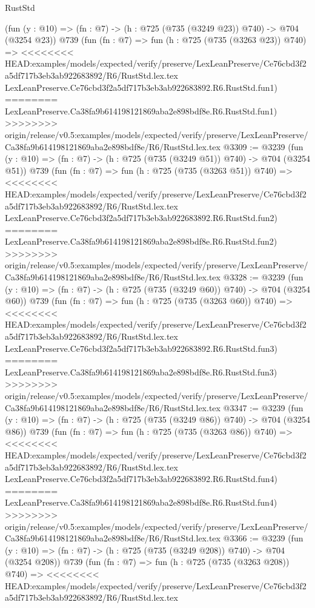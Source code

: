 \begin{lexlean}{RustStd}
\begin{coremodule}
{\begin{coremodule}
{{{{{{{{{{    (fun (y : @10) => (fn : @7) -> (h : @725 (@735 (@3249 @23)) @740) -> @704 (@3254 @23))
    @739
    (fun (fn : @7) =>
    fun (h : @725 (@735 (@3263 @23)) @740) =>
<<<<<<<< HEAD:examples/models/expected/verify/preserve/LexLeanPreserve/Ce76cbd3f2a5df717b3eb3ab922683892/R6/RustStd.lex.tex
    LexLeanPreserve.Ce76cbd3f2a5df717b3eb3ab922683892.R6.RustStd.fun1)
========
    LexLeanPreserve.Ca38fa9b614198121869aba2e898bdf8e.R6.RustStd.fun1)
>>>>>>>> origin/release/v0.5:examples/models/expected/verify/preserve/LexLeanPreserve/Ca38fa9b614198121869aba2e898bdf8e/R6/RustStd.lex.tex
@3309 := @3239
    (fun (y : @10) => (fn : @7) -> (h : @725 (@735 (@3249 @51)) @740) -> @704 (@3254 @51))
    @739
    (fun (fn : @7) =>
    fun (h : @725 (@735 (@3263 @51)) @740) =>
<<<<<<<< HEAD:examples/models/expected/verify/preserve/LexLeanPreserve/Ce76cbd3f2a5df717b3eb3ab922683892/R6/RustStd.lex.tex
    LexLeanPreserve.Ce76cbd3f2a5df717b3eb3ab922683892.R6.RustStd.fun2)
========
    LexLeanPreserve.Ca38fa9b614198121869aba2e898bdf8e.R6.RustStd.fun2)
>>>>>>>> origin/release/v0.5:examples/models/expected/verify/preserve/LexLeanPreserve/Ca38fa9b614198121869aba2e898bdf8e/R6/RustStd.lex.tex
@3328 := @3239
    (fun (y : @10) => (fn : @7) -> (h : @725 (@735 (@3249 @60)) @740) -> @704 (@3254 @60))
    @739
    (fun (fn : @7) =>
    fun (h : @725 (@735 (@3263 @60)) @740) =>
<<<<<<<< HEAD:examples/models/expected/verify/preserve/LexLeanPreserve/Ce76cbd3f2a5df717b3eb3ab922683892/R6/RustStd.lex.tex
    LexLeanPreserve.Ce76cbd3f2a5df717b3eb3ab922683892.R6.RustStd.fun3)
========
    LexLeanPreserve.Ca38fa9b614198121869aba2e898bdf8e.R6.RustStd.fun3)
>>>>>>>> origin/release/v0.5:examples/models/expected/verify/preserve/LexLeanPreserve/Ca38fa9b614198121869aba2e898bdf8e/R6/RustStd.lex.tex
@3347 := @3239
    (fun (y : @10) => (fn : @7) -> (h : @725 (@735 (@3249 @86)) @740) -> @704 (@3254 @86))
    @739
    (fun (fn : @7) =>
    fun (h : @725 (@735 (@3263 @86)) @740) =>
<<<<<<<< HEAD:examples/models/expected/verify/preserve/LexLeanPreserve/Ce76cbd3f2a5df717b3eb3ab922683892/R6/RustStd.lex.tex
    LexLeanPreserve.Ce76cbd3f2a5df717b3eb3ab922683892.R6.RustStd.fun4)
========
    LexLeanPreserve.Ca38fa9b614198121869aba2e898bdf8e.R6.RustStd.fun4)
>>>>>>>> origin/release/v0.5:examples/models/expected/verify/preserve/LexLeanPreserve/Ca38fa9b614198121869aba2e898bdf8e/R6/RustStd.lex.tex
@3366 := @3239
    (fun (y : @10) => (fn : @7) -> (h : @725 (@735 (@3249 @208)) @740) -> @704 (@3254 @208))
    @739
    (fun (fn : @7) =>
    fun (h : @725 (@735 (@3263 @208)) @740) =>
<<<<<<<< HEAD:examples/models/expected/verify/preserve/LexLeanPreserve/Ce76cbd3f2a5df717b3eb3ab922683892/R6/RustStd.lex.tex
}}}}}}}}}}
\end{coremodule}}
\end{coremodule}
\end{lexlean}
